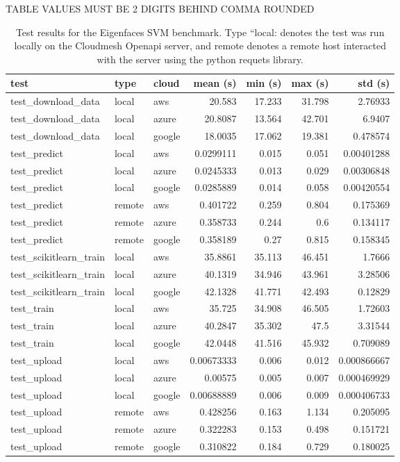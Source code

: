 \begin{table}[htb]
  
\caption{Test results for the Eigenfaces SVM benchmark. Type
``local: denotes the test was run locally on the Cloudmesh Openapi
server, and remote denotes a remote host interacted with the server
using the python requets library.}
\label{tab:2}

TABLE VALUES MUST BE 2 DIGITS BEHIND COMMA ROUNDED

\begin{tabular}[]{@{}lllrrrr@{}}
\toprule
test & type & cloud & mean (s) & min (s) & max (s) & std
(s)\tabularnewline
\midrule
test\_download\_data & local & aws & 20.583 & 17.233 & 31.798 &
2.76933\tabularnewline
test\_download\_data & local & azure & 20.8087 & 13.564 & 42.701 &
6.9407\tabularnewline
test\_download\_data & local & google & 18.0035 & 17.062 & 19.381 &
0.478574\tabularnewline
test\_predict & local & aws & 0.0299111 & 0.015 & 0.051 &
0.00401288\tabularnewline
test\_predict & local & azure & 0.0245333 & 0.013 & 0.029 &
0.00306848\tabularnewline
test\_predict & local & google & 0.0285889 & 0.014 & 0.058 &
0.00420554\tabularnewline
test\_predict & remote & aws & 0.401722 & 0.259 & 0.804 &
0.175369\tabularnewline
test\_predict & remote & azure & 0.358733 & 0.244 & 0.6 &
0.134117\tabularnewline
test\_predict & remote & google & 0.358189 & 0.27 & 0.815 &
0.158345\tabularnewline
test\_scikitlearn\_train & local & aws & 35.8861 & 35.113 & 46.451 &
1.7666\tabularnewline
test\_scikitlearn\_train & local & azure & 40.1319 & 34.946 & 43.961 &
3.28506\tabularnewline
test\_scikitlearn\_train & local & google & 42.1328 & 41.771 & 42.493 &
0.12829\tabularnewline
test\_train & local & aws & 35.725 & 34.908 & 46.505 &
1.72603\tabularnewline
test\_train & local & azure & 40.2847 & 35.302 & 47.5 &
3.31544\tabularnewline
test\_train & local & google & 42.0448 & 41.516 & 45.932 &
0.709089\tabularnewline
test\_upload & local & aws & 0.00673333 & 0.006 & 0.012 &
0.000866667\tabularnewline
test\_upload & local & azure & 0.00575 & 0.005 & 0.007 &
0.000469929\tabularnewline
test\_upload & local & google & 0.00688889 & 0.006 & 0.009 &
0.000406733\tabularnewline
test\_upload & remote & aws & 0.428256 & 0.163 & 1.134 &
0.205095\tabularnewline
test\_upload & remote & azure & 0.322283 & 0.153 & 0.498 &
0.151721\tabularnewline
test\_upload & remote & google & 0.310822 & 0.184 & 0.729 &
0.180025\tabularnewline
\bottomrule
\end{tabular}
\end{table}

